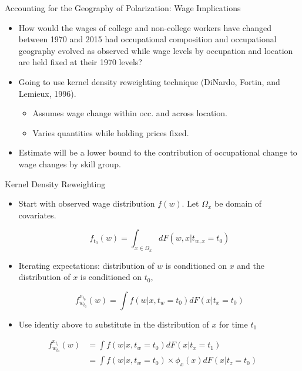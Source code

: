 \documentclass{beamer}
\begin{document}
\begin{frame}{Accounting for the Geography of Polarization: Wage Implications}

\begin{itemize}

	\item How would the wages of college and non-college workers have changed between 1970 and 2015 had occupational composition and occupational geography evolved as observed while wage levels by occupation and location are held fixed at their 1970 levels?
	
	\bigskip
	
	\item Going to use kernel density reweighting technique (DiNardo, Fortin, and Lemieux, 1996).
	\begin{itemize}
		\item Assumes wage change within occ. and across location. 
		\item Varies quantities while holding prices fixed.
	\end{itemize}

	\bigskip
	
	\item Estimate will be a lower bound  to the contribution of occupational change to wage changes by skill group.
	
\end{itemize}

\end{frame}

\begin{frame}{Kernel Density Reweighting}

\begin{itemize}
	
	\item Start with observed wage distribution $f(w)$. Let $\Omega_x$ be domain of covariates.
	
	\begin{equation*}
	f_{t_0}(w) = \int_{x \in \Omega_x} dF(w,x | t_{w,x} = t_0)
	\end{equation*}
	
	\item Iterating expectations: distribution of $w$ is conditioned on $x$ and the distribution of $x$ is conditioned on $t_0$,
	
	\begin{equation*}
	f_{w_{t_0}}^{x_{t_0}}(w) = \int f(w| x, t_{w} = t_0) dF(x | t_x = t_0)
	\end{equation*}
	
	\item Use identiy above to substitute in the distribution of $x$ for time $t_1$
	
\end{itemize}

\begin{align*}
f_{w_{t_0}}^{x_{t_1}}(w) &= \int f(w| x, t_{w} = t_0) dF(x | t_x = t_1) \\
&= \int f(w| x, t_{w} = t_0) \times \phi_x(x)dF(x | t_z = t_0)
\end{align*}


\end{frame}
\end{document}
